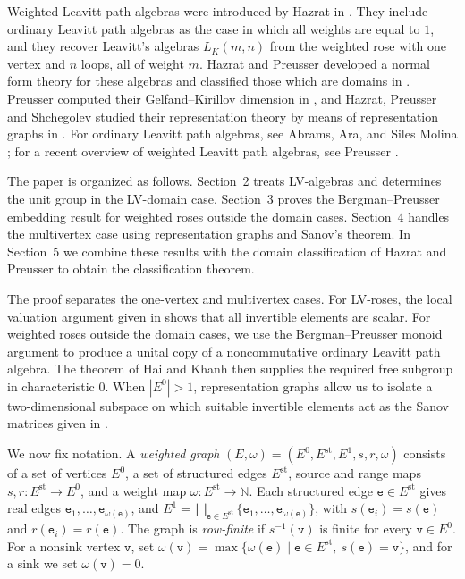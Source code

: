 \documentclass{article}
\theoremstyle{definition}
\begin{document}
Weighted Leavitt path algebras were introduced by Hazrat in \cite{Ha}. They include ordinary Leavitt path algebras as the case in which all weights are equal to $1$, and they recover Leavitt's algebras $L_K(m,n)$ from the weighted rose with one vertex and $n$ loops, all of weight $m$. Hazrat and Preusser developed a normal form theory for these algebras and classified those which are domains in \cite{HaP}. Preusser computed their Gelfand--Kirillov dimension in \cite{Pre3}, and Hazrat, Preusser and Shchegolev studied their representation theory by means of representation graphs in \cite{HPS}. For ordinary Leavitt path algebras, see Abrams, Ara, and Siles Molina \cite{AAS}; for a recent overview of weighted Leavitt path algebras, see Preusser \cite{Pre4}.


The paper is organized as follows. Section~2 treats LV-algebras and determines the unit group in the LV-domain case. Section~3 proves the Bergman--Preusser embedding result for weighted roses outside the domain cases. Section~4 handles the multivertex case using representation graphs and Sanov's theorem. In Section~5 we combine these results with the domain classification of Hazrat and Preusser to obtain the classification theorem.

The proof separates the one-vertex and multivertex cases. For LV-roses, the local valuation argument given in \cite{HaP} shows that all invertible elements are scalar. For weighted roses outside the domain cases, we use the Bergman--Preusser monoid argument to produce a unital copy of a noncommutative ordinary Leavitt path algebra. The theorem of Hai and Khanh then supplies the required free subgroup in characteristic $0$. When $|E^0|>1$, representation graphs allow us to isolate a two-dimensional subspace on which suitable invertible elements act as the Sanov matrices given in \cite{S}.

We now fix notation. A \emph{weighted graph} $(E,\omega)=(E^0,E^{\mathrm{st}},E^1,s,r,\omega)$ consists of a set of vertices $E^0$, a set of structured edges $E^{\mathrm{st}}$, source and range maps $s,r:E^{\mathrm{st}}\to E^0$, and a weight map $\omega:E^{\mathrm{st}}\to\mathbb N$. Each structured edge $\mathtt{e}\in E^{\mathrm{st}}$ gives real edges $\mathtt{e}_1,\ldots,\mathtt{e}_{\omega(\mathtt{e})}$, and $E^1=\bigsqcup_{\mathtt{e}\in E^{\mathrm{st}}}\{\mathtt{e}_1,\ldots,\mathtt{e}_{\omega(\mathtt{e})}\}$, with $s(\mathtt{e}_i)=s(\mathtt{e})$ and $r(\mathtt{e}_i)=r(\mathtt{e})$. The graph is \emph{row-finite} if $s^{-1}(\mathtt{v})$ is finite for every $\mathtt{v}\in E^0$. For a nonsink vertex $\mathtt{v}$, set $\omega(\mathtt{v})=\max\{\omega(\mathtt{e})\mid \mathtt{e}\in E^{\mathrm{st}},\ s(\mathtt{e})=\mathtt{v}\}$, and for a sink we set $\omega(\mathtt{v})=0$.
\end{document}
